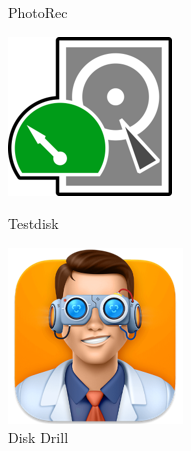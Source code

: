\documentclass[12pt,oneside,slovak,a4paper]{article}
\begin{document}
\begin{figure}[H]
\begin{minipage}{.2\textwidth}
		\captionsetup{justification=centering}
        \caption{PhotoRec}
    \end{minipage}\hfill
    \centering
	\begin{minipage}{.2\textwidth}
        \centering
        \includegraphics[width=\linewidth]{./images/tools-avatars/testdisk.png}
		\captionsetup{justification=centering}
        \caption{Testdisk}
    \end{minipage}\hfill
	\begin{minipage}{.2\textwidth}
        \centering
        \includegraphics[width=\linewidth]{./images/tools-avatars/disk_drill.png}
		\captionsetup{justification=centering}
        \caption{Disk Drill}
    \end{minipage}\hfill
\end{figure}
\end{document}
